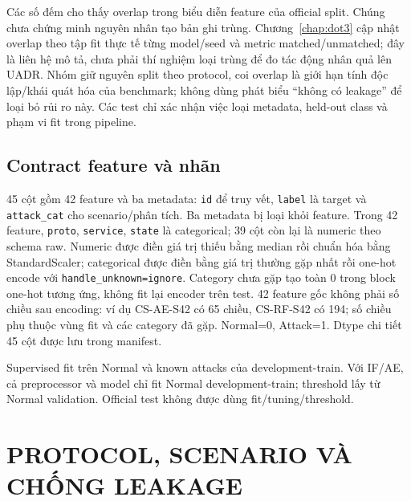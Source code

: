 \documentclass[12pt,a4paper,oneside]{report}
\begin{document}
Các số đếm cho thấy overlap trong biểu diễn feature của official split. Chúng chưa chứng minh nguyên nhân tạo bản ghi trùng. Chương~\ref{chap:dot3} cập nhật overlap theo tập fit thực tế từng model/seed và metric matched/unmatched; đây là liên hệ mô tả, chưa phải thí nghiệm loại trùng để đo tác động nhân quả lên UADR. Nhóm giữ nguyên split theo protocol, coi overlap là giới hạn tính độc lập/khái quát hóa của benchmark; không dùng phát biểu ``không có leakage'' để loại bỏ rủi ro này. Các test chỉ xác nhận việc loại metadata, held-out class và phạm vi fit trong pipeline.

\section{Contract feature và nhãn}
45 cột gồm 42 feature và ba metadata: \texttt{id} để truy vết, \texttt{label} là target và \texttt{attack\_cat} cho scenario/phân tích. Ba metadata bị loại khỏi feature. Trong 42 feature, \texttt{proto}, \texttt{service}, \texttt{state} là categorical; 39 cột còn lại là numeric theo schema raw. Numeric được điền giá trị thiếu bằng median rồi chuẩn hóa bằng StandardScaler; categorical được điền bằng giá trị thường gặp nhất rồi one-hot encode với \texttt{handle\_unknown=ignore}. Category chưa gặp tạo toàn 0 trong block one-hot tương ứng, không fit lại encoder trên test. 42 feature gốc không phải số chiều sau encoding: ví dụ CS-AE-S42 có 65 chiều, CS-RF-S42 có 194; số chiều phụ thuộc vùng fit và các category đã gặp. Normal=0, Attack=1. Dtype chi tiết 45 cột được lưu trong manifest.

Supervised fit trên Normal và known attacks của development-train. Với IF/AE, cả preprocessor và model chỉ fit Normal development-train; threshold lấy từ Normal validation. Official test không được dùng fit/tuning/threshold.


\chapter{PROTOCOL, SCENARIO VÀ CHỐNG LEAKAGE}
\end{document}
